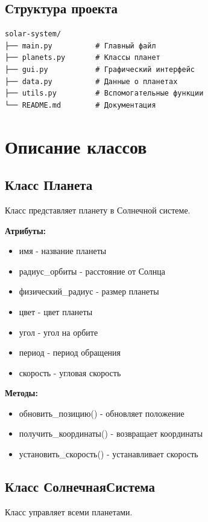 \documentclass[12pt,a4paper]{article}
\begin{document}
\subsection{Структура проекта}

\begin{verbatim}
solar-system/
├── main.py          # Главный файл
├── planets.py       # Классы планет
├── gui.py           # Графический интерфейс
├── data.py          # Данные о планетах
├── utils.py         # Вспомогательные функции
└── README.md        # Документация
\end{verbatim}

\section{Описание классов}

\subsection{Класс Планета}

Класс представляет планету в Солнечной системе.

\textbf{Атрибуты:}
\begin{itemize}
    \item имя - название планеты
    \item радиус\_орбиты - расстояние от Солнца
    \item физический\_радиус - размер планеты
    \item цвет - цвет планеты
    \item угол - угол на орбите
    \item период - период обращения
    \item скорость - угловая скорость
\end{itemize}

\textbf{Методы:}
\begin{itemize}
    \item обновить\_позицию() - обновляет положение
    \item получить\_координаты() - возвращает координаты
    \item установить\_скорость() - устанавливает скорость
\end{itemize}

\subsection{Класс СолнечнаяСистема}

Класс управляет всеми планетами.
\end{document}

